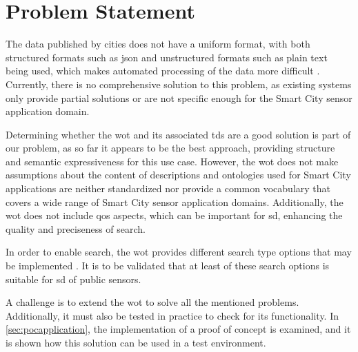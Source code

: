 \section{Problem Statement}\label{sec:problem-statement}

The data published by cities does not have a uniform format, with both structured formats such as \gls{json} and unstructured formats such as plain text being used, which makes automated processing of the data more difficult \autocite{govdata}. Currently, there is no comprehensive solution to this problem, as existing systems only provide partial solutions or are not specific enough for the Smart City sensor application domain.

Determining whether the \gls{wot} and its associated \glspl{td} are a good solution is part of our problem, as so far it appears to be the best approach, providing structure and semantic expressiveness for this use case. However, the \gls{wot} does not make assumptions about the content of descriptions and ontologies used for Smart City applications are neither standardized nor provide a common vocabulary that covers a wide range of Smart City sensor application domains. Additionally, the \gls{wot} does not include \gls{qos} aspects, which can be important for \gls{sd}, enhancing the quality and preciseness of search.

In order to enable search, the \gls{wot} provides different search type options that may be implemented \autocite[section 7.3.2.3]{w3c.wot.discovery.20210602}. It is to be validated that at least of these search options is suitable for \gls{sd} of public sensors.

A challenge is to extend the \gls{wot} to solve all the mentioned problems. Additionally, it must also be tested in practice to check for its functionality. In \autoref{sec:pocapplication}, the implementation of a proof of concept is examined, and it is shown how this solution can be used in a test environment.
